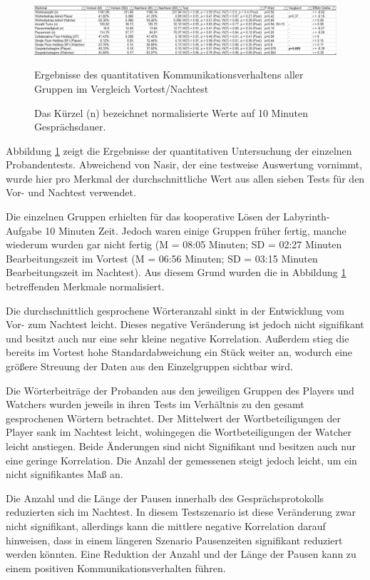 \begin{figure}[ht]
\centering
\includegraphics[width=1\linewidth]{content/pictures/quantitative_communication_results.png}
\caption{Ergebnisse des quantitativen Kommunikationsverhaltens aller Gruppen im Vergleich Vortest/Nachtest}
\caption*{\footnotesize Das Kürzel (n) bezeichnet normalisierte Werte auf 10 Minuten Gesprächsdauer.}
\label{fig:communication-results}
\end{figure}

Abbildung \ref{fig:communication-results} zeigt die Ergebnisse der quantitativen Untersuchung der einzelnen Probandentests. Abweichend von Nasir, der eine testweise Auswertung vornimmt, wurde hier pro Merkmal der durchschnittliche Wert aus allen sieben Tests für den Vor- und Nachtest verwendet.

Die einzelnen Gruppen erhielten für das kooperative Lösen der Labyrinth-Aufgabe 10 Minuten Zeit. Jedoch waren einige Gruppen früher fertig, manche wiederum wurden gar nicht fertig (M = 08:05 Minuten; SD = 02:27 Minuten Bearbeitungszeit im Vortest (M = 06:56 Minuten; SD = 03:15 Minuten Bearbeitungszeit im Nachtest). Aus diesem Grund wurden die in Abbildung \ref{fig:communication-results} betreffenden Merkmale normalisiert.

Die durchschnittlich gesprochene Wörteranzahl sinkt in der Entwicklung vom Vor- zum Nachtest leicht. Dieses negative Veränderung ist jedoch nicht signifikant und besitzt auch nur eine sehr kleine negative Korrelation. Außerdem stieg die bereits im Vortest hohe Standardabweichung ein Stück weiter an, wodurch eine größere Streuung der Daten aus den Einzelgruppen sichtbar wird. 

Die Wörterbeiträge der Probanden aus den jeweiligen Gruppen des Players und Watchers wurden jeweils in ihren Tests im Verhältnis zu den gesamt gesprochenen Wörtern betrachtet. Der Mittelwert der Wortbeteiligungen der Player sank im Nachtest leicht, wohingegen die Wortbeteiligungen der Watcher leicht anstiegen. Beide Änderungen sind nicht Signifikant und besitzen auch nur eine geringe Korrelation. Die Anzahl der gemessenen  steigt jedoch leicht, um ein nicht signifikantes Maß an.

Die Anzahl und die Länge der Pausen innerhalb des Gesprächsprotokolls reduzierten sich im Nachtest. In diesem Testszenario ist diese Veränderung zwar nicht signifikant, allerdings kann die mittlere negative Korrelation darauf hinweisen, dass in einem längeren Szenario Pausenzeiten signifikant reduziert werden könnten. Eine Reduktion der Anzahl und der Länge der Pausen kann zu einem positiven Kommunikationsverhalten führen.

